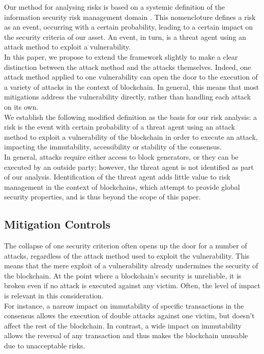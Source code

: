 \documentclass[12pt,a4paper]{article}
\begin{document}
Our method for analysing risks is based on a systemic definition of the information security risk management domain \cite{domain}. This nomencloture defines a risk as an event, occurring with a certain probability, leading to a certain impact on the security criteria of our asset. An event, in turn, is a threat agent using an attack method to exploit a vulnerability.\\

In this paper, we propose to extend the framework slightly to make a clear distinction between the attack method and the attacks themselves. Indeed, one attack method applied to one vulnerability can open the door to the execution of a variety of attacks in the context of blockchain. In general, this means that most mitigations address the vulnerability directly, rather than handling each attack on its own.\\

We establish the following modified definition as the basis for our risk analysis: a risk is the event with certain probability of a threat agent using an attack method to exploit a vulnerability of the \gls{blockchain} in order to execute an attack, impacting the immutability, accessibility or stability of the \gls{consensus}.\\

In general, attacks require either access to block generators, or they can be executed by an outside party; however, the threat agent is not identified as part of our analysis. Identification of the threat agent adds little value to risk management in the context of \glspl{blockchain}, which attempt to provide global security properties, and is thus beyond the scope of this paper.\\

\subsection{Mitigation Controls}

The collapse of one security criterion often opens up the door for a number of attacks, regardless of the attack method used to exploit the vulnerability. This means that the mere exploit of a vulnerability already undermines the security of the \gls{blockchain}. At the point where a \gls{blockchain}'s security is unreliable, it is broken even if no attack is executed against any victim. Often, the level of impact is relevant in this consideration.\\

For instance, a narrow impact on immutability of specific \glspl{transaction} in the \gls{consensus} allows the execution of \gls{double} attacks against one victim, but doesn't affect the rest of the \gls{blockchain}. In contrast, a wide impact on immutability allows the reversal of any \gls{transaction} and thus makes the \gls{blockchain} unusable due to unacceptable risks.\\
\end{document}
